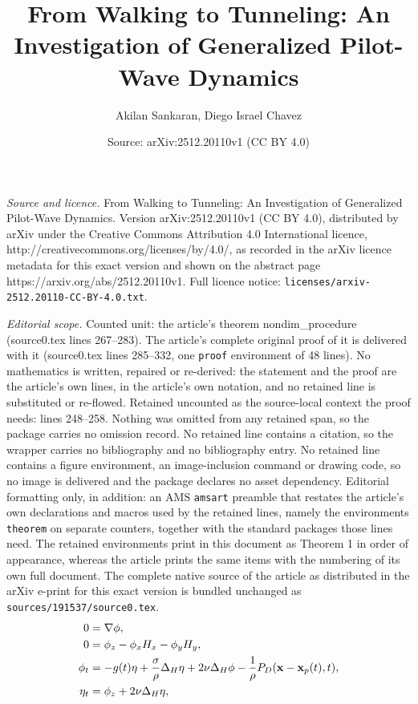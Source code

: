\documentclass[10pt,a4paper]{amsart}
\title{From Walking to Tunneling: An Investigation of Generalized Pilot-Wave Dynamics}
\author{Akilan Sankaran, Diego Israel Chavez}
\date{Source: arXiv:2512.20110v1 (CC BY 4.0)}
\newcommand{\M}[1]{\mathbf{#1}}
\begin{document}
\maketitle

\noindent\emph{Source and licence.} From Walking to Tunneling: An Investigation of Generalized Pilot-Wave Dynamics. Version arXiv:2512.20110v1 (CC BY 4.0), distributed by arXiv under the Creative Commons Attribution 4.0 International licence, http://creativecommons.org/licenses/by/4.0/, as recorded in the arXiv licence metadata for this exact version and shown on the abstract page https://arxiv.org/abs/2512.20110v1. Full licence notice: \texttt{licenses/arxiv-2512.20110-CC-BY-4.0.txt}.\par\smallskip

\noindent\textit{Editorial scope.} Counted unit: the article's theorem nondim\_procedure (source0.tex lines 267--283). The article's complete original proof of it is delivered with it (source0.tex lines 285--332, one \texttt{proof} environment of 48 lines). No mathematics is written, repaired or re-derived: the statement and the proof are the article's own lines, in the article's own notation, and no retained line is substituted or re-flowed.  Retained uncounted as the source-local context the proof needs: lines 248--258.  Nothing was omitted from any retained span, so the package carries no omission record.  No retained line contains a citation, so the wrapper carries no bibliography and no bibliography entry.  No retained line contains a figure environment, an image-inclusion command or drawing code, so no image is delivered and the package declares no asset dependency.  Editorial formatting only, in addition: an AMS \texttt{amsart} preamble that restates the article's own declarations and macros used by the retained lines, namely the environments \texttt{theorem} on separate counters, together with the standard packages those lines need.  The retained environments print in this document as Theorem 1 in order of appearance, whereas the article prints the same items with the numbering of its own full document.  The complete native source of the article as distributed in the arXiv e-print for this exact version is bundled unchanged as \texttt{sources/191537/source0.tex}.
    \begin{align}
\centering
\label{thm_3_first_first_eq}
    0 &= \nabla \phi, \\
\label{bottom_thm_3.1}
    0 &= \phi_z - \phi_x H_x - \phi_y H_y,\\
\label{phi_t_thm_3.1}
    \phi_t &= -g(t) \eta + \frac{\sigma}{\rho} \Delta_{H} \eta  + 2 \nu \Delta_{H} \phi - \frac{1}{\rho} P_D(\M{x} - \M{x}_p(t), t) ,\\
\label{eta_t_thm_3.1}
    \eta_t &= \phi_z + 2 \nu \Delta_{H} \eta,
\end{align}
\end{document}
